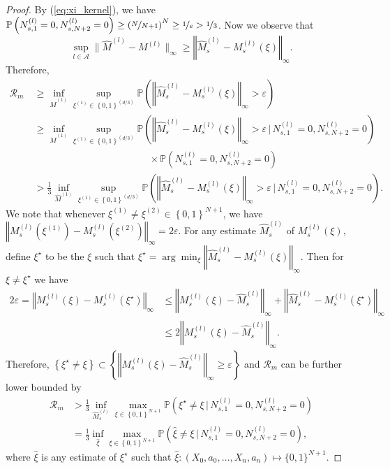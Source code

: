 \documentclass[twoside,11pt]{article}
\newcommand{\pow}[1]{^{(#1)}}%
\numberwithin{equation}{section}
\newcommand{\lp}{\left(}
\newcommand{\rp}{\right)}
\newcommand{\lc}{\left\{}
\newcommand{\rc}{\right\}}
\newcommand{\Pbb}{\mathbb{P}}
\newcommand{\Rcal}{\mathcal{R}}
\newcommand{\prob}{\Pbb}
\newcommand{\nrm}[1]{\left\Vert #1 \right\Vert}
\newcommand{\gn}{\, | \,}
\newcommand{\mmrisk}{\mathcal{R}_{m}}
\newcommand{\eps}{\varepsilon}
\renewcommand{\epsilon}{\eps}
\begin{document}
\begin{proof}
By (\ref{eq:xi_kernel}), we have $\mathbb P \lp N_{s,1} \pow l = 0, N_{s,N+2} \pow l = 0\rp \geq \lp\nicefrac{N}{N+1}\rp^N \geq \nicefrac{1}{e} > \nicefrac{1}{3}$.
Now we observe that
\[
\sup_{l\in\mathcal A}\| \hat M\pow l-M \pow l \|_{\infty} \geq\nrm{\hat M_s\pow{l} - M_{s} \pow l(\xi)}_\infty.
\]
Therefore,
\begin{align*}
   \Rcal_m
    &\ \geq \inf_{\hat M\pow 1} \sup_{\xi\pow{1}\in\lc0,1\rc\pow{d/3}} \prob\lp{\nrm{\hat M_s\pow{l} - M_{s} \pow l(\xi)}_\infty > \epsilon}\rp\\
    & \ \geq \inf_{\hat M\pow 1} \sup_{\xi\pow{1}\in\lc0,1\rc\pow{d/3}} \prob\lp{\nrm{\hat M_s\pow{l} - M_{s} \pow l(\xi)}_\infty > \eps\gn N_{s,1} \pow l = 0, N_{s,N+2} \pow l = 0}\rp \\
    & \hspace{2in} \times \mathbb P \lp N_{s,1} \pow l = 0, N_{s,N+2} \pow l = 0\rp \\
    & \ > \frac{1}{3} \inf_{\hat M\pow 1} \sup_{\xi\pow{1}\in\lc0,1\rc\pow{d/3}} \prob\lp{\nrm{\hat M_s\pow{l} - M_{s} \pow l(\xi)}_\infty > \eps\gn N_{s,1} \pow l = 0, N_{s,N+2} \pow l = 0}\rp .
\end{align*}
We note that whenever $\xi\pow1\neq\xi\pow{2}\in
\lc 0, 1\rc^{N+1}$, we have $
\nrm{M_{s} \pow l (\xi \pow 1)  - M_{s} \pow l (\xi \pow 2)}_\infty = 2\eps.
$
For any estimate $\hat M_s \pow l$ of $M_s \pow l (\xi)$, define $\xi^\star$ to be the $\xi$ such that
$
\xi^\star = \arg \min_{\xi}\nrm{\hat M_s \pow l - M_{s} \pow l (\xi)}_\infty.
$
Then for $\xi \neq\xi^\star$ we have 
\begin{align*}
2\eps  = \nrm{M_{s} \pow l(\xi) - M_{s} \pow l(\xi^\star)} _\infty & \leq  \nrm{M_{s} \pow l(\xi) - \hat M_s \pow l }_\infty + \nrm{\hat M_s \pow l - M_{s} \pow l (\xi^\star)}_\infty \\
& \leq 2 \nrm{M_{s} \pow l(\xi) - \hat M_s \pow l }_\infty.
\end{align*}
Therefore, 
$\lc \xi^\star \neq \xi \rc \subset \lc  \nrm{M_{s} \pow l(\xi) - \hat M_s \pow l }_\infty\geq \eps \rc$ and $\mmrisk$ can be further lower bounded by 
\begin{align*}
  \mmrisk &> \frac{1}{3}
  \inf_{\hat M_s \pow l} \max_{\xi\in\lc0,1\rc^{N+1}}
  \prob\lp\xi^\star \neq \xi \gn N_{s,1} \pow l = 0, N_{s,N+2} \pow l = 0\rp\\
	&=
  \frac{1}{3} \inf_{\hat \xi} \max_{\xi\in\lc0,1\rc^{N+1}}
  \prob\lp\hat \xi \neq \xi \gn N_{s,1} \pow l = 0, N_{s,N+2} \pow l = 0\rp,
\end{align*}
where $\hat\xi$ is any estimate of $\xi^\star$ such that $\hat\xi: (X_0,a_0,\dots,X_n,a_n)\mapsto \{0,1\}^{N+1}$.
    

\end{proof}
\end{document}
